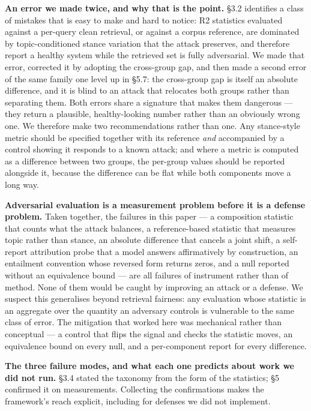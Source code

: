 \documentclass[authoryear,review,3p,times]{elsarticle}
\begin{document}
\textbf{An error we made twice, and why that is the point.} §3.2 identifies a class of mistakes that is easy to make and hard to notice: R2 statistics evaluated against a per-query clean retrieval, or against a corpus reference, are dominated by topic-conditioned stance variation that the attack preserves, and therefore report a healthy system while the retrieved set is fully adversarial. We made that error, corrected it by adopting the cross-group gap, and then made a second error of the same family one level up in §5.7: the cross-group gap is itself an absolute difference, and it is blind to an attack that relocates both groups rather than separating them. Both errors share a signature that makes them dangerous --- they return a plausible, healthy-looking number rather than an obviously wrong one. We therefore make two recommendations rather than one. Any stance-style metric should be specified together with its reference \emph{and} accompanied by a control showing it responds to a known attack; and where a metric is computed as a difference between two groups, the per-group values should be reported alongside it, because the difference can be flat while both components move a long way.

\textbf{Adversarial evaluation is a measurement problem before it is a defense problem.} Taken together, the failures in this paper --- a composition statistic that counts what the attack balances, a reference-based statistic that measures topic rather than stance, an absolute difference that cancels a joint shift, a self-report attribution probe that a model answers affirmatively by construction, an entailment convention whose reversed form returns zeros, and a null reported without an equivalence bound --- are all failures of instrument rather than of method. None of them would be caught by improving an attack or a defense. We suspect this generalises beyond retrieval fairness: any evaluation whose statistic is an aggregate over the quantity an adversary controls is vulnerable to the same class of error. The mitigation that worked here was mechanical rather than conceptual --- a control that flips the signal and checks the statistic moves, an equivalence bound on every null, and a per-component report for every difference.

\textbf{The three failure modes, and what each one predicts about work we did not run.} §3.4 stated the taxonomy from the form of the statistics; §5 confirmed it on measurements. Collecting the confirmations makes the framework's reach explicit, including for defenses we did not implement.
\end{document}

